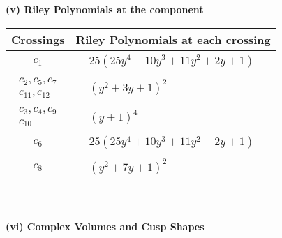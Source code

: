 \documentclass[1p]{elsarticle_modified}
\theoremstyle{definition}
\begin{document}
\newpage\renewcommand{\arraystretch}{1}
\flushleft \textbf{(v) Riley Polynomials at the component}\newline \\
\begin{tabular}{m{50pt}|m{274pt}}
Crossings & \hspace{64pt}Riley Polynomials at each crossing \\
\hline $$\begin{aligned}c_{1}\end{aligned}$$&$\begin{aligned}
&25(25 y^4-10 y^3+11 y^2+2 y+1)
\end{aligned}$\\
\hline $$\begin{aligned}c_{2},c_{5},c_{7}\\c_{11},c_{12}\end{aligned}$$&$\begin{aligned}
&(y^2+3 y+1)^2
\end{aligned}$\\
\hline $$\begin{aligned}c_{3},c_{4},c_{9}\\c_{10}\end{aligned}$$&$\begin{aligned}
&(y+1)^4
\end{aligned}$\\
\hline $$\begin{aligned}c_{6}\end{aligned}$$&$\begin{aligned}
&25(25 y^4+10 y^3+11 y^2-2 y+1)
\end{aligned}$\\
\hline $$\begin{aligned}c_{8}\end{aligned}$$&$\begin{aligned}
&(y^2+7 y+1)^2
\end{aligned}$\\
\hline
\end{tabular}\\~\\
\newpage\flushleft \textbf{(vi) Complex Volumes and Cusp Shapes}
\end{document}
